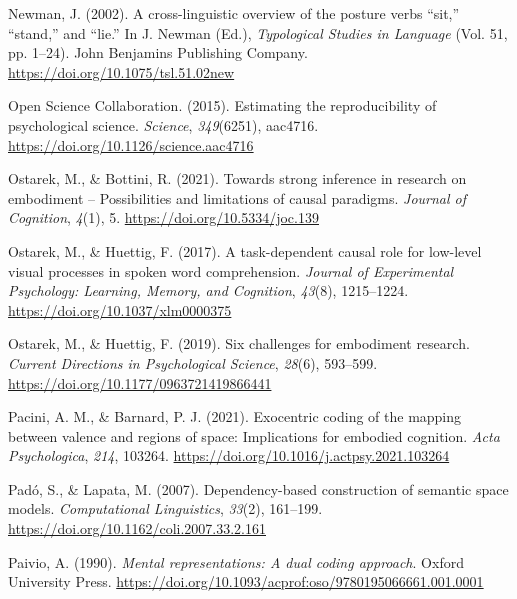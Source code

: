 \documentclass[
  12pt,
  man,floatsintext]{apa7}
\newlength{\cslhangindent}
\newlength{\cslentryspacingunit} %
\newenvironment{CSLReferences}[2] %
 {%
  \setlength{\parindent}{0pt}
  \ifodd #1
  \let\oldpar\par
  \def\par{\hangindent=\cslhangindent\oldpar}
  \fi
  \setlength{\parskip}{#2\cslentryspacingunit}
 }%
 {}
\begin{document}
\begin{CSLReferences}{1}{0}
\leavevmode{}%
Newman, J. (2002). A cross-linguistic overview of the posture verbs {``sit,''} {``stand,''} and {``lie.''} In J. Newman (Ed.), \emph{Typological {Studies} in {Language}} (Vol. 51, pp. 1--24). {John Benjamins Publishing Company}. \url{https://doi.org/10.1075/tsl.51.02new}

\leavevmode{}%
Open Science Collaboration. (2015). Estimating the reproducibility of psychological science. \emph{Science}, \emph{349}(6251), aac4716. \url{https://doi.org/10.1126/science.aac4716}

\leavevmode{}%
Ostarek, M., \& Bottini, R. (2021). Towards strong inference in research on embodiment -- {Possibilities} and limitations of causal paradigms. \emph{Journal of Cognition}, \emph{4}(1), 5. \url{https://doi.org/10.5334/joc.139}

\leavevmode{}%
Ostarek, M., \& Huettig, F. (2017). A task-dependent causal role for low-level visual processes in spoken word comprehension. \emph{Journal of Experimental Psychology: Learning, Memory, and Cognition}, \emph{43}(8), 1215--1224. \url{https://doi.org/10.1037/xlm0000375}

\leavevmode{}%
Ostarek, M., \& Huettig, F. (2019). Six challenges for embodiment research. \emph{Current Directions in Psychological Science}, \emph{28}(6), 593--599. \url{https://doi.org/10.1177/0963721419866441}

\leavevmode{}%
Pacini, A. M., \& Barnard, P. J. (2021). Exocentric coding of the mapping between valence and regions of space: {Implications} for embodied cognition. \emph{Acta Psychologica}, \emph{214}, 103264. \url{https://doi.org/10.1016/j.actpsy.2021.103264}

\leavevmode{}%
Padó, S., \& Lapata, M. (2007). Dependency-based construction of semantic space models. \emph{Computational Linguistics}, \emph{33}(2), 161--199. \url{https://doi.org/10.1162/coli.2007.33.2.161}

\leavevmode{}%
Paivio, A. (1990). \emph{Mental representations: A dual coding approach}. {Oxford University Press}. \url{https://doi.org/10.1093/acprof:oso/9780195066661.001.0001}


\end{CSLReferences}
\end{document}
